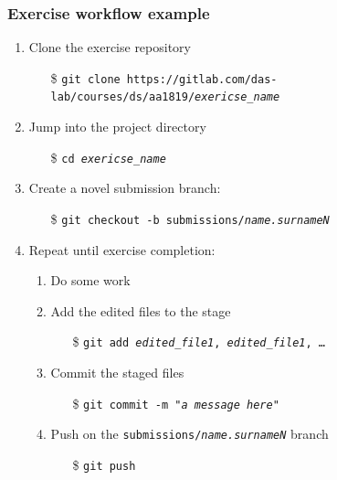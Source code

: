 \documentclass[handout]{beamer}\mode<presentation>{\usetheme{AMSCesenaBleu}}
\begin{document}
\begin{frame}[allowframebreaks]
\frametitle{Exercise workflow example}

    \begin{enumerate}
        \item Clone the exercise repository
        \begin{itemize}
            \item[\$] \texttt{git clone https://gitlab.com/das-lab/courses/ds/aa1819/\alert{\textit{exericse\_name}}}
        \end{itemize}
        
        \item Jump into the project directory
        \begin{itemize}
            \item[\$] \texttt{cd \alert{\textit{exericse\_name}}}
        \end{itemize}
        
        \item Create a novel submission branch:
        \begin{itemize}
            \item[\$] \texttt{git checkout -b submissions/\textit{\alert{name.surnameN}}}
        \end{itemize}
        
        \item Repeat until exercise completion:
        \begin{enumerate}
            \item Do some work
            \item Add the edited files to the stage
            \begin{itemize}
                \item[\$] \texttt{git add \textit{\alert{edited\_file1}}, \textit{\alert{edited\_file1}}, \ldots}
            \end{itemize}
            \item Commit the staged files 
            \begin{itemize}
                \item[\$] \texttt{git commit -m "\textit{\alert{a message here}}"}
            \end{itemize}
            \item Push on the \texttt{submissions/\textit{\alert{name.surnameN}}} branch
            \begin{itemize}
                \item[\$] \texttt{git \alert{push}}
            \end{itemize}
        \end{enumerate}
        

\end{enumerate}
\end{frame}
\end{document}
